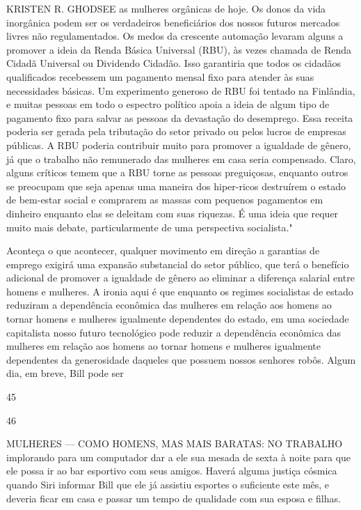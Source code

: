 KRISTEN R. GHODSEE as mulheres orgânicas de hoje. Os donos da vida inorgânica podem ser os verdadeiros beneficiários dos nossos futuros mercados livres não regulamentados. Os medos da crescente automação levaram alguns a promover a ideia da Renda Básica Universal (RBU), às vezes chamada de Renda Cidadã Universal ou Dividendo Cidadão. Isso garantiria que todos os cidadãos qualificados recebessem um pagamento mensal fixo para atender às suas necessidades básicas. Um experimento generoso de RBU foi tentado na Finlândia, e muitas pessoas em todo o espectro político apoia a ideia de algum tipo de pagamento fixo para salvar as pessoas da devastação do desemprego. Essa receita poderia ser gerada pela tributação do setor privado ou pelos lucros de empresas públicas. A RBU poderia contribuir muito para promover a igualdade de gênero, já que o trabalho não remunerado das mulheres em casa seria compensado. Claro, alguns críticos temem que a RBU torne as pessoas preguiçosas, enquanto outros se preocupam que seja apenas uma maneira dos hiper-ricos destruírem o estado de bem-estar social e comprarem as massas com pequenos pagamentos em dinheiro enquanto elas se deleitam com suas riquezas. É uma ideia que requer muito mais debate, particularmente de uma perspectiva socialista."
 \par 
Aconteça o que acontecer, qualquer movimento em direção a garantias de emprego exigirá uma expansão substancial do setor público, que terá o benefício adicional de promover a igualdade de gênero ao eliminar a diferença salarial entre homens e mulheres. A ironia aqui é que enquanto os regimes socialistas de estado reduziram a dependência econômica das mulheres em relação aos homens ao tornar homens e mulheres igualmente dependentes do estado, em uma sociedade capitalista nosso futuro tecnológico pode reduzir a dependência econômica das mulheres em relação aos homens ao tornar homens e mulheres igualmente dependentes da generosidade daqueles que possuem nossos senhores robôs. Algum dia, em breve, Bill pode ser
 \par 
45
 \par 
46
 \par 
MULHERES — COMO HOMENS, MAS MAIS BARATAS: NO TRABALHO implorando para um computador dar a ele sua mesada de sexta à noite para que ele possa ir ao bar esportivo com seus amigos. Haverá alguma justiça cósmica quando Siri informar Bill que ele já assistiu esportes o suficiente este mês, e deveria ficar em casa e passar um tempo de qualidade com sua esposa e filhas.
 \par 
